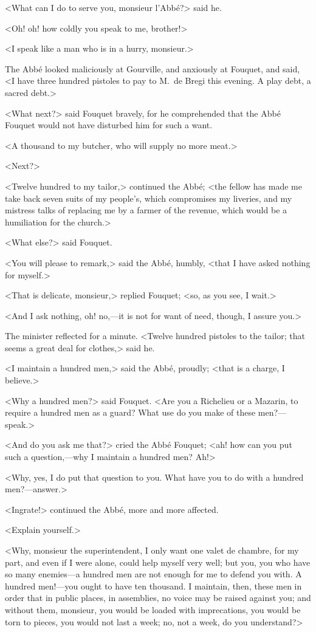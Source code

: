 <What can I do to serve you, monsieur l'Abbé?> said he.

<Oh! oh! how coldly you speak to me, brother!>

<I speak like a man who is in a hurry, monsieur.>

The Abbé looked maliciously at Gourville, and anxiously at Fouquet, and said, <I have three hundred pistoles to pay to M.~de Bregi this evening. A play debt, a sacred debt.>

<What next?> said Fouquet bravely, for he comprehended that the Abbé Fouquet would not have disturbed him for such a want.

<A thousand to my butcher, who will supply no more meat.>

<Next?>

<Twelve hundred to my tailor,> continued the Abbé; <the fellow has made me take back seven suits of my people's, which compromises my liveries, and my mistress talks of replacing me by a farmer of the revenue, which would be a humiliation for the church.>

<What else?> said Fouquet.

<You will please to remark,> said the Abbé, humbly, <that I have asked nothing for myself.>

<That is delicate, monsieur,> replied Fouquet; <so, as you see, I wait.>

<And I ask nothing, oh! no,—it is not for want of need, though, I assure you.>

The minister reflected for a minute. <Twelve hundred pistoles to the tailor; that seems a great deal for clothes,> said he.

<I maintain a hundred men,> said the Abbé, proudly; <that is a charge, I believe.>

<Why a hundred men?> said Fouquet. <Are you a Richelieu or a Mazarin, to require a hundred men as a guard? What use do you make of these men?—speak.>

<And do you ask me that?> cried the Abbé Fouquet; <ah! how can you put such a question,—why I maintain a hundred men? Ah!>

<Why, yes, I do put that question to you. What have you to do with a hundred men?—answer.>

<Ingrate!> continued the Abbé, more and more affected.

<Explain yourself.>

<Why, monsieur the superintendent, I only want one valet de chambre, for my part, and even if I were alone, could help myself very well; but you, you who have so many enemies—a hundred men are not enough for me to defend you with. A hundred men!—you ought to have ten thousand. I maintain, then, these men in order that in public places, in assemblies, no voice may be raised against you; and without them, monsieur, you would be loaded with imprecations, you would be torn to pieces, you would not last a week; no, not a week, do you understand?>

